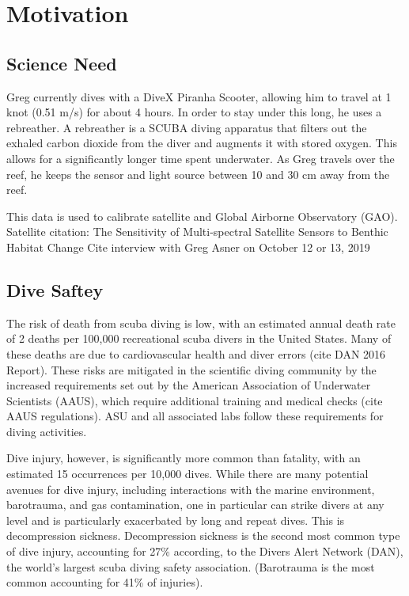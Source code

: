 \chapter{Motivation}

\section{Science Need}

Greg currently dives with a DiveX Piranha Scooter, allowing him to travel at 1 knot (0.51 m/s) for about 4 hours. In order to stay under this long, he uses a rebreather. A rebreather is a SCUBA diving apparatus that filters out the exhaled carbon dioxide from the diver and augments it with stored oxygen. This allows for a significantly longer time spent underwater. As Greg travels over the reef, he keeps the sensor and light source between 10 and 30 cm away from the reef.

This data is used to calibrate satellite and Global Airborne Observatory (GAO). Satellite citation: The Sensitivity of Multi-spectral Satellite Sensors to Benthic Habitat Change
Cite interview with Greg Asner on October 12 or 13, 2019

\section{Dive Saftey}

The risk of death from scuba diving is low, with an estimated annual death rate of 2 deaths per 100,000 recreational scuba divers in the United States. Many of these deaths are due to cardiovascular health and diver errors (cite DAN 2016 Report). These risks are mitigated in the scientific diving community by the increased requirements set out by the American Association of Underwater Scientists (AAUS), which require additional training and medical checks (cite AAUS regulations). ASU and all associated labs follow these requirements for diving activities.

Dive injury, however, is significantly more common than fatality, with an estimated 15 occurrences per 10,000 dives. While there are many potential avenues for dive injury, including interactions with the marine environment, barotrauma, and gas contamination, one in particular can strike divers at any level and is particularly exacerbated by long and repeat dives. This is decompression sickness. Decompression sickness is the second most common type of dive injury, accounting for 27\% according, to the Divers Alert Network (DAN), the world's largest scuba diving safety association. (Barotrauma is the most common accounting for 41\% of injuries). 

